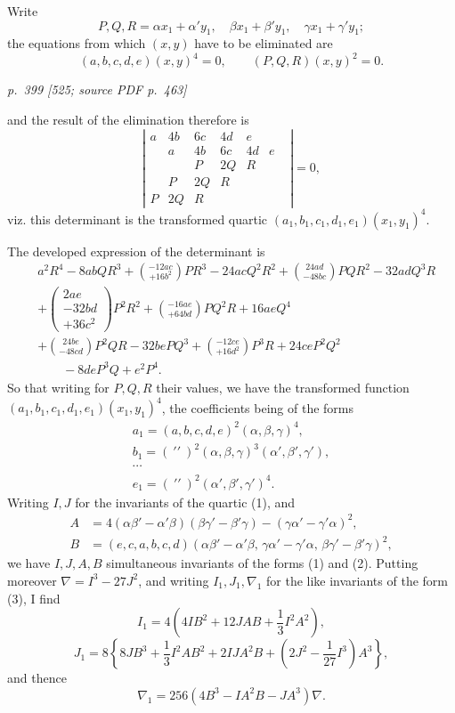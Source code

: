 \documentclass[11pt,a4paper]{article}
\newcommand{\pagemarker}[3]{\par\bigskip\noindent\textit{p.~#1 [#2; source PDF p.~#3]}\par\smallskip}
\begin{document}
Write
\[
P,Q,R=\alpha x_1+\alpha' y_1,\quad \beta x_1+\beta' y_1,\quad
\gamma x_1+\gamma' y_1;
\]
the equations from which $(x,y)$ have to be eliminated are
\[
(a,b,c,d,e)(x,y)^4=0,\qquad (P,Q,R)(x,y)^2=0.
\]

\pagemarker{399}{525}{463}

and the result of the elimination therefore is
\[
\left|\begin{array}{ccccccc}
a&4b&6c&4d&e&&\\
&a&4b&6c&4d&e&\\
&&P&2Q&R&&\\
&P&2Q&R&&&\\
P&2Q&R&&&&
\end{array}\right|=0,
\]
viz. this determinant is the transformed quartic
$(a_1,b_1,c_1,d_1,e_1)(x_1,y_1)^4$.

The developed expression of the determinant is
\[
\begin{aligned}
&a^2R^4-8abQR^3
+\binom{-12ac}{+16b^2}PR^3-24acQ^2R^2+\binom{24ad}{-48bc}PQR^2-32adQ^3R\\
&+\left(\begin{array}{r}2ae\\-32bd\\+36c^2\end{array}\right)P^2R^2
+\binom{-16ae}{+64bd}PQ^2R+16aeQ^4\\
&+\binom{24be}{-48cd}P^2QR-32bePQ^3+\binom{-12ce}{+16d^2}P^3R
+24ceP^2Q^2\\
&\qquad -8deP^3Q+e^2P^4.
\end{aligned}
\]
So that writing for $P,Q,R$ their values, we have the transformed function
$(a_1,b_1,c_1,d_1,e_1)(x_1,y_1)^4$, the coefficients being of the forms
\[
\begin{gathered}
a_1=(a,b,c,d,e)^2(\alpha,\beta,\gamma)^4,\\
b_1=(\ \prime\prime\ )^2(\alpha,\beta,\gamma)^3(\alpha',\beta',\gamma'),\\
\cdots\\
e_1=(\ \prime\prime\ )^2(\alpha',\beta',\gamma')^4.
\end{gathered}
\]
Writing $I,J$ for the invariants of the quartic (1), and
\[
\begin{aligned}
A&=4(\alpha\beta'-\alpha'\beta)(\beta\gamma'-\beta'\gamma)
-(\gamma\alpha'-\gamma'\alpha)^2,\\
B&=(e,c,a,b,c,d)(\alpha\beta'-\alpha'\beta,\,
\gamma\alpha'-\gamma'\alpha,\,
\beta\gamma'-\beta'\gamma)^2,
\end{aligned}
\]
we have $I,J,A,B$ simultaneous invariants of the forms (1) and (2). Putting moreover
$\nabla=I^3-27J^2$, and writing $I_1,J_1,\nabla_1$ for the like invariants of the
form (3), I find
\[
I_1=4\left(4IB^2+12JAB+\frac13I^2A^2\right),
\]
\[
J_1=8\left\{8JB^3+\frac13I^2AB^2+2IJA^2B+
\left(2J^2-\frac1{27}I^3\right)A^3\right\},
\]
and thence
\[
\nabla_1=256(4B^3-IA^2B-JA^3)\nabla.
\]
\end{document}
